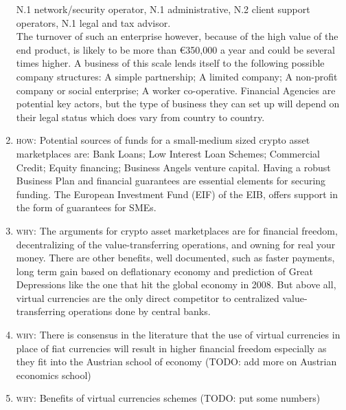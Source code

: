 \documentclass[11pt,fleqn,oneside]{book} %
\begin{document}
\begin{enumerate}
	N.1 network/security operator, N.1 administrative, N.2 client support operators, N.1 legal and tax advisor. \\
	The turnover of such an enterprise however, because of the high value of the end product, is likely to be more than 
	\euro 350,000 a year and could be several times higher. A business of
	this scale lends itself to the following possible company structures: A simple partnership;
	A limited company; A non-profit company or social enterprise; A worker co-operative.
	Financial Agencies are potential key actors, but the type of business they can set up will
	depend on their legal status which does vary from country to country.
	\item \textsc{how}: Potential sources of funds for a small-medium sized crypto asset marketplaces are: Bank Loans; Low
	Interest Loan Schemes; Commercial Credit; Equity financing; Business Angels venture
	capital. Having a robust Business Plan and financial guarantees are essential elements
	for securing funding. The European Investment Fund (EIF) of the EIB, offers support in
	the form of guarantees for SMEs.
	\item \textsc{why}: The arguments for crypto asset marketplaces are for financial freedom, decentralizing of the value-transferring operations, and
	owning for real your money. 
	There are other benefits, well documented, such as faster payments, long term gain based on deflationary economy and prediction of 
	Great Depressions like the one that hit the global economy in 2008. But
	above all, virtual currencies are the only direct competitor to centralized value-transferring operations done by central banks.

	\item \textsc{why}: There is consensus in the literature that the use of virtual currencies in place of fiat currencies will result in 
	higher financial freedom especially as they fit into the Austrian school of economy \cite{austrianTheory} 
	(TODO: add more on Austrian economics school)

	\item \textsc{why}: Benefits of virtual currencies schemes (TODO: put some numbers)


\end{enumerate}
\end{document}
